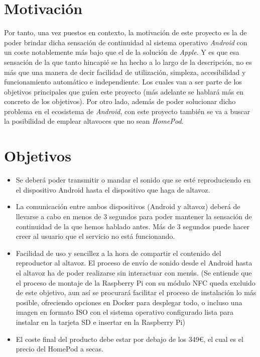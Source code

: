 \section{Motivación}
Por tanto, una vez puestos en contexto, la motivación de este proyecto es la de poder brindar dicha sensación de continuidad al sistema operativo \emph{Android} con un coste notablemente más bajo que el de la solución de \emph{Apple}. Y es que esa sensación de la que tanto hincapié se ha hecho a lo largo de la descripción, no es más que una manera de decir facilidad de utilización, simpleza, accesibilidad y funcionamiento automático e independiente. Los cuales van a ser parte de los objetivos principales que guíen este proyecto (más adelante se hablará más en concreto de los objetivos). Por otro lado, además de poder solucionar dicho problema en el ecosistema de \emph{Android}, con este proyecto también se va a buscar la posibilidad de emplear altavoces que no sean \emph{HomePod}. 

\section{Objetivos}
\begin{itemize}
    \item Se deberá poder transmitir o mandar el sonido que se esté reproduciendo en el dispositivo Android hasta el dispositivo que haga de altavoz.
    \item La comunicación entre ambos dispositivos (Android y altavoz) deberá de llevarse a cabo en menos de 3 segundos para poder mantener la sensación de continuidad de la que hemos hablado antes. Más de 3 segundos puede hacer creer al usuario que el servicio no está funcionando.
    \item Facilidad de uso y sencillez a la hora de compartir el contenido del reproductor al altavoz. El proceso de envío de sonido desde el Android hasta el altavoz ha de poder realizarse sin interactuar con menús. (Se entiende que el proceso de montaje de la Raspberry Pi con su módulo NFC queda excluido de este objetivo, aun así se procurará facilitar el proceso de instalación lo más posible, ofreciendo opciones en Docker para desplegar todo, o incluso una imagen en formato ISO con el sistema operativo configurado lista para instalar en la tarjeta SD e insertar en la Raspberry Pi)
    \item El coste final del producto debe estar por debajo de los 349€, el cual es el precio del HomePod a secas.
\end{itemize}


